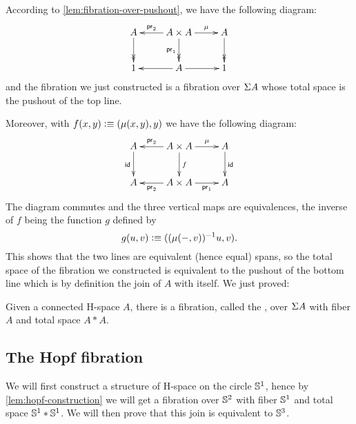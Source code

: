 According to \autoref{lem:fibration-over-pushout}, we have the following
diagram:
%
\[\xymatrix{A \ar@{->>}[d] & A \times A \ar[l]_-{\proj2} \ar@{->>}_{\proj1}[d]
  \ar[r]^-{\mu} & A \ar@{->>}[d] \\
  1 & A \ar[r] \ar[l] & 1}\]
%
and the fibration we just constructed is a fibration over $\Sigma A$ whose total
space is the pushout of the top line.

Moreover, with $f(x,y)\vcentcolon\equiv(\mu(x,y),y)$ we have the following diagram:
%
\[\xymatrix{A \ar_\idfunc[d] & A \times A \ar[l]_-{\proj2} \ar^f[d]
  \ar[r]^-{\mu} & A \ar^\idfunc[d] \\
  A & A\times A \ar^-{\proj2}[l] \ar_-{\proj1}[r] & A}\]
%
The diagram commutes and the three vertical maps are equivalences, the inverse
of $f$ being the function $g$ defined by
\[g(u,v)\vcentcolon\equiv((\mu(-,v))^{-1}u,v).\]
%
This shows that the two lines are equivalent (hence equal) spans, so the total
space of the fibration we constructed is equivalent to the pushout of the bottom
line which is by definition the join of $A$ with itself.
%
We just proved:

\begin{lem}\label{lem:hopf-construction}
  Given a connected H-space $A$, there is a fibration, called the
  , over $\Sigma A$ with fiber $A$ and total space $A*A$.
\end{lem}

\subsection{The Hopf fibration}

We will first construct a structure of H-space on the circle $\mathbb{S}^1$, hence by
\autoref{lem:hopf-construction} we will get a fibration over $\mathbb{S}^2$ with fiber
$\mathbb{S}^1$ and total space $\mathbb{S}^1*\mathbb{S}^1$. We will then prove that this join is
equivalent to $\mathbb{S}^3$.

